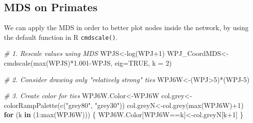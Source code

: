 \documentclass[
  notitlepage,
  onecolumn,
  openany]{book}
\newenvironment{Shaded}{\begin{snugshade}}{\end{snugshade}}
\newcommand{\AttributeTok}[1]{\textcolor[rgb]{0.77,0.63,0.00}{#1}}
\newcommand{\CommentTok}[1]{\textcolor[rgb]{0.56,0.35,0.01}{\textit{#1}}}
\newcommand{\ConstantTok}[1]{\textcolor[rgb]{0.00,0.00,0.00}{#1}}
\newcommand{\ControlFlowTok}[1]{\textcolor[rgb]{0.13,0.29,0.53}{\textbf{#1}}}
\newcommand{\DecValTok}[1]{\textcolor[rgb]{0.00,0.00,0.81}{#1}}
\newcommand{\FloatTok}[1]{\textcolor[rgb]{0.00,0.00,0.81}{#1}}
\newcommand{\FunctionTok}[1]{\textcolor[rgb]{0.00,0.00,0.00}{#1}}
\newcommand{\NormalTok}[1]{#1}
\newcommand{\OtherTok}[1]{\textcolor[rgb]{0.56,0.35,0.01}{#1}}
\newcommand{\SpecialCharTok}[1]{\textcolor[rgb]{0.00,0.00,0.00}{#1}}
\newcommand{\StringTok}[1]{\textcolor[rgb]{0.31,0.60,0.02}{#1}}
\begin{document}
\hypertarget{mds-on-primates}{%
\subsection{MDS on Primates}\label{mds-on-primates}}

We can apply the MDS in order to better plot nodes inside the network, by using the default function in R \texttt{cmdscale()}.

\begin{Shaded}
\begin{Highlighting}[]
\CommentTok{\# 1. Rescale values using MDS}
\NormalTok{WPJS}\OtherTok{\textless{}{-}}\FunctionTok{log}\NormalTok{(WPJ}\SpecialCharTok{+}\DecValTok{1}\NormalTok{)}
\NormalTok{WPJ\_CoordMDS}\OtherTok{\textless{}{-}}\FunctionTok{cmdscale}\NormalTok{(}\FunctionTok{max}\NormalTok{(WPJS)}\SpecialCharTok{*}\FloatTok{1.001}\SpecialCharTok{{-}}\NormalTok{WPJS, }\AttributeTok{eig=}\ConstantTok{TRUE}\NormalTok{, }\AttributeTok{k =} \DecValTok{2}\NormalTok{)}

\CommentTok{\# 2. Consider drawing only "relatively strong" ties}
\NormalTok{WPJ6W}\OtherTok{\textless{}{-}}\NormalTok{(WPJ}\SpecialCharTok{\textgreater{}}\DecValTok{5}\NormalTok{)}\SpecialCharTok{*}\NormalTok{(WPJ}\DecValTok{{-}5}\NormalTok{)}

\CommentTok{\# 3. Create color for ties}
\NormalTok{WPJ6W.Color}\OtherTok{\textless{}{-}}\NormalTok{WPJ6W}
\NormalTok{col.grey}\OtherTok{\textless{}{-}}\FunctionTok{colorRampPalette}\NormalTok{(}\FunctionTok{c}\NormalTok{(}\StringTok{"grey80"}\NormalTok{, }\StringTok{"grey30"}\NormalTok{))}
\NormalTok{col.greyN}\OtherTok{\textless{}{-}}\FunctionTok{col.grey}\NormalTok{(}\FunctionTok{max}\NormalTok{(WPJ6W)}\SpecialCharTok{+}\DecValTok{1}\NormalTok{)}
\ControlFlowTok{for}\NormalTok{ (k }\ControlFlowTok{in}\NormalTok{ (}\DecValTok{1}\SpecialCharTok{:}\FunctionTok{max}\NormalTok{(WPJ6W)))}
\NormalTok{\{}
\NormalTok{    WPJ6W.Color[WPJ6W}\SpecialCharTok{==}\NormalTok{k]}\OtherTok{\textless{}{-}}\NormalTok{col.greyN[k}\SpecialCharTok{+}\DecValTok{1}\NormalTok{]}
\NormalTok{\}}


\end{Highlighting}
\end{Shaded}
\end{document}
